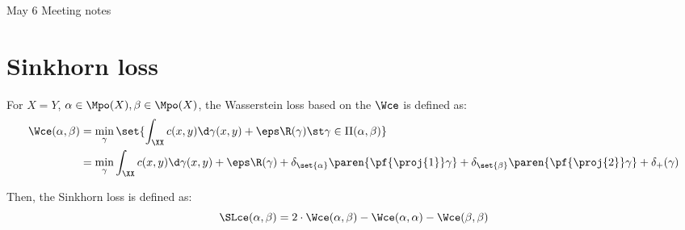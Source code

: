 \documentclass[11pt,a4paper]{article}
\begin{document}

{\Huge May  6 Meeting notes}

\section*{Sinkhorn loss}

For $X=Y$, $\alpha \in \Mpo(X), \beta \in \Mpo(X)$, the Wasserstein loss based on the $\Wce$ is defined as:
\begin{align}
    \label{eqn:wasserstein-loss}
    \Wce(\alpha, \beta) &= \min_{\gamma} \set{ \int_{\XX} c(x, y) \d \gamma(x, y) + \eps \R(\gamma) \st \gamma \in \Pi(\alpha, \beta)} \\
                        &= \min_{\gamma} \int_{\XX} c(x, y) \d \gamma(x, y) + \eps \R(\gamma) + \delta_{\set{\alpha}}\paren{ \pf{\proj{1}}\gamma } + \delta_{\set{\beta}}\paren{\pf{\proj{2}}\gamma} + \delta_{+}(\gamma)
\end{align}

Then, the Sinkhorn loss is defined as:
\begin{equation}
    \SLce(\alpha, \beta) = 2\cdot \Wce(\alpha, \beta) - \Wce(\alpha, \alpha) - \Wce(\beta, \beta)
\end{equation}
\end{document}
